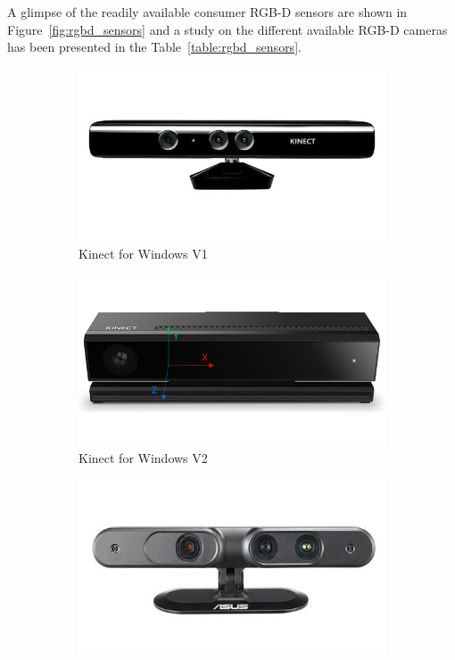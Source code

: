 	 A glimpse of the readily available consumer RGB-D sensors are shown in Figure~\ref{fig:rgbd_sensors} and a study on the different available RGB-D cameras has been presented in the Table~\ref{table:rgbd_sensors}.
\begin{figure}
\centering
\begin{subfigure}[b]{0.33\textwidth}
\includegraphics[width=\textwidth]{assets/kinectv1.jpg}
\caption{Kinect for Windows V1}
\label{fig:kinectv1}
\end{subfigure}%
\begin{subfigure}[b]{0.33\textwidth}
\includegraphics[width=\textwidth]{assets/kinectv2_2.png}
\caption{Kinect for Windows V2}
\label{fig:kinectv2}
\end{subfigure}%
\begin{subfigure}[b]{0.33\textwidth}
\includegraphics[width=\textwidth]{assets/asus_xtion.jpg}

\end{subfigure}
\end{figure}
